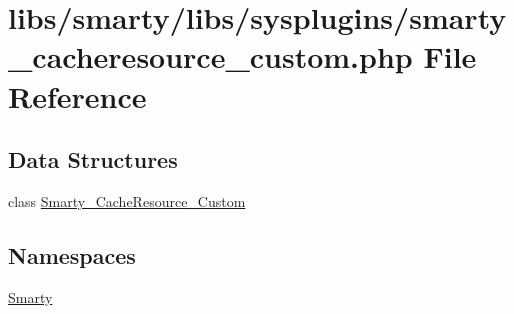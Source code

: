 \hypertarget{smarty__cacheresource__custom_8php}{}\section{libs/smarty/libs/sysplugins/smarty\+\_\+cacheresource\+\_\+custom.php File Reference}
\label{smarty__cacheresource__custom_8php}
\subsection*{Data Structures}
\begin{DoxyCompactItemize}
\item 
class \hyperlink{class_smarty___cache_resource___custom}{Smarty\+\_\+\+Cache\+Resource\+\_\+\+Custom}
\end{DoxyCompactItemize}
\subsection*{Namespaces}
\begin{DoxyCompactItemize}
\item 
 \hyperlink{namespace_smarty}{Smarty}
\end{DoxyCompactItemize}
